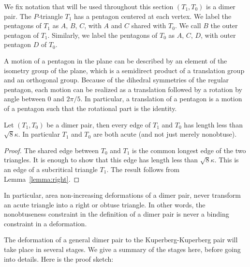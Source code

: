 We fix notation that will be used throughout this section $(T_1,T_0)$ is a dimer pair.
The $P$-triangle $T_1$ has a pentagon centered at each vertex.  We label the pentagons of $T_1$ as
$A$, $B$, $C$, with $A$ and $C$ shared with $T_0$.  We call $B$ the outer pentagon of $T_1$.
Similarly, we label the pentagons of $T_0$ as $A$, $C$, $D$, with outer pentagon $D$ of $T_0$.

A motion of a pentagon in the plane can be described by an element of the isometry group of
the plane, which is a semidirect product of a translation group and an orthogonal group.  
Because of the dihedral
symmetries of the regular pentagon, each motion can be realized as a translation followed
by a rotation by angle between $0$ and $2\pi/5$.   In particular, a translation of a pentagon is a motion of
a pentagon such that the rotational part is the identity.

\begin{lemma}  Let $(T_1,T_0)$ be a dimer pair, then every edge of $T_1$ and $T_0$ has length
less than $\sqrt8\kappa$.  In particular $T_1$ and $T_0$ are both acute (and not just merely nonobtuse).
\end{lemma}

\begin{proof}  The shared edge between $T_0$ and $T_1$ is the common longest edge of the
two triangles.  It is enough to show that this edge has length less than $\sqrt8\kappa$.
This is an edge of a subcritical triangle $T_1$. The result follows from Lemma~\ref{lemma:right}.
\end{proof}

In particular, area non-increasing deformations of a dimer pair, never transform an acute
triangle into a right or obtuse triangle.  In other words, the nonobtuseness constraint in the
definition of a dimer pair is never a binding constraint in a deformation.

The deformation of a general dimer pair to the Kuperberg-Kuperberg pair will take place in several
stages.  We give a summary of the stages here, before going into details.  Here is the proof sketch:

